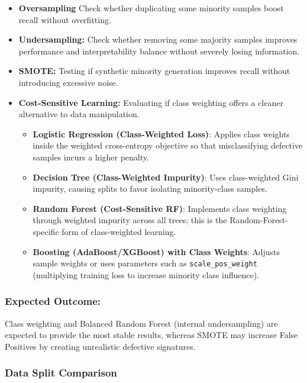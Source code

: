\documentclass{article}
\begin{document}
\begin{itemize}
    \item \textbf{Oversampling} Check whether duplicating some minority samples boost recall without overfitting.
    \item \textbf{Undersampling:} Check whether removing some majority samples improves performance and interpretability balance without severely losing information.
    \item \textbf{SMOTE:} Testing if synthetic minority generation improves recall without introducing excessive noise.
    \item \textbf{Cost-Sensitive Learning:} Evaluating if class weighting offers a cleaner alternative to data manipulation.
    \begin{itemize}
    \item \textbf{Logistic Regression (Class-Weighted Loss)}: Applies class weights inside the weighted cross-entropy objective so that misclassifying defective samples incurs a higher penalty.
 
    \item \textbf{Decision Tree (Class-Weighted Impurity)}: Uses class-weighted Gini impurity, causing splits to favor isolating minority-class samples.
 
    \item \textbf{Random Forest (Cost-Sensitive RF)}: Implements class weighting through weighted impurity across all trees; this is the Random-Forest-specific form of class-weighted learning.
 
    \item \textbf{Boosting (AdaBoost/XGBoost) with Class Weights}: Adjusts sample weights or uses parameters such as \texttt{scale\_pos\_weight} (multiplying training loss to increase minority class influence).
\end{itemize}
 
\end{itemize}
 
\subsubsection*{Expected Outcome:}
 
Class weighting and Balanced Random Forest (internal undersampling) are expected to provide the most stable results, whereas SMOTE may increase False Positives by creating unrealistic defective signatures.
 
\subsubsection*{Data Split Comparison}
 
\end{document}
